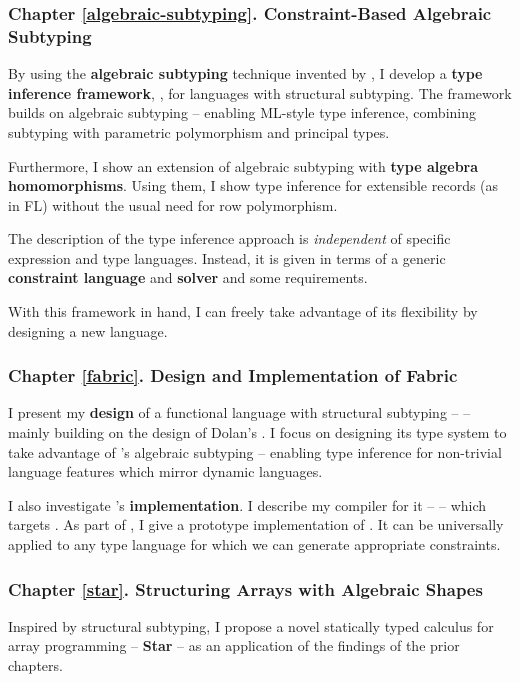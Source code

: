 \subsubsection{Chapter \ref{algebraic-subtyping}. Constraint-Based Algebraic Subtyping}

By using the \textbf{algebraic subtyping} technique invented by \textcite{dolan-thesis}, I develop a \textbf{type inference framework}, \inference{}, for languages with structural subtyping. 
The framework builds on algebraic subtyping -- enabling ML-style type inference, combining subtyping with parametric polymorphism and principal types. 

Furthermore, I show an extension of algebraic subtyping with \textbf{type algebra homomorphisms}. Using them, I show type inference for extensible records (as in FL) without the usual need for row polymorphism.

The description of the type inference approach is \emph{independent} of specific expression and type languages. Instead, it is given in terms of a generic \textbf{constraint language} and \textbf{solver} and some requirements. 

With this framework in hand, I can freely take advantage of its flexibility by designing a new language.

\subsubsection{Chapter \ref{fabric}. Design and Implementation of Fabric}
I present my \textbf{design} of a functional language with structural subtyping -- \textbf{\fabric{}} -- mainly building on the design of Dolan's \mlsub{}. I focus on designing its type system to take advantage of \inference{}'s algebraic subtyping -- enabling type inference for non-trivial language features which mirror dynamic languages.

I also investigate \fabric{}'s \textbf{implementation}. I describe my compiler for it -- \compiler{} -- which targets \wasm{}. 
As part of \compiler{}, I give a prototype implementation of \inference{}. It can be universally applied to any type language for which we can generate appropriate constraints.

\subsubsection{Chapter \ref{star}. Structuring Arrays with Algebraic Shapes}
Inspired by structural subtyping, I propose a novel statically typed calculus for array  programming -- \textbf{Star} -- as an application of the findings of the prior chapters. 

